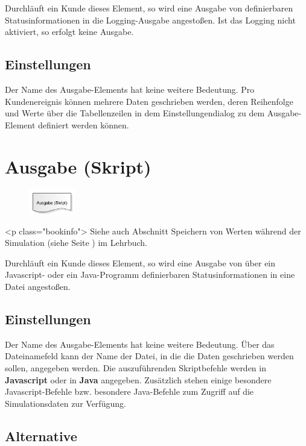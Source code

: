 Durchläuft ein Kunde dieses Element, so wird eine Ausgabe von definierbaren Statusinformationen in
die Logging-Ausgabe angestoßen. Ist das Logging nicht aktiviert, so erfolgt keine Ausgabe.

\subsection*{Einstellungen}

Der Name des Ausgabe-Elements hat keine weitere Bedeutung. Pro Kundenereignis können mehrere Daten
geschrieben werden, deren Reihenfolge und Werte über die Tabellenzeilen in dem Einstellungendialog zu
dem Ausgabe-Element definiert werden können.


\section{Ausgabe (Skript)}
\label{ref:ModelElementOutputJS}

\begin{figure}
\vspace{-22pt}
\includegraphics[width=2cm]{imageModelElementOutputJS.png}
\vspace{-22pt}
\end{figure}

<p class="bookinfo">
Siehe auch Abschnitt Speichern von Werten während der Simulation (siehe Seite \pageref{ref:book:9.3.3}) im Lehrbuch.

Durchläuft ein Kunde dieses Element, so wird eine Ausgabe von über ein Javascript-
oder ein Java-Programm definierbaren Statusinformationen in eine Datei angestoßen.

\subsection*{Einstellungen}

Der Name des Ausgabe-Elements hat keine weitere Bedeutung. Über das Dateinamefeld kann der Name der Datei,
in die die Daten geschrieben werden sollen, angegeben werden. Die auszuführenden Skriptbefehle werden in
\textbf{Javascript} oder in \textbf{Java} angegeben. Zusätzlich stehen einige
besondere Javascript-Befehle bzw. besondere Java-Befehle 
zum Zugriff auf die Simulationsdaten zur Verfügung.

\subsection*{Alternative}

